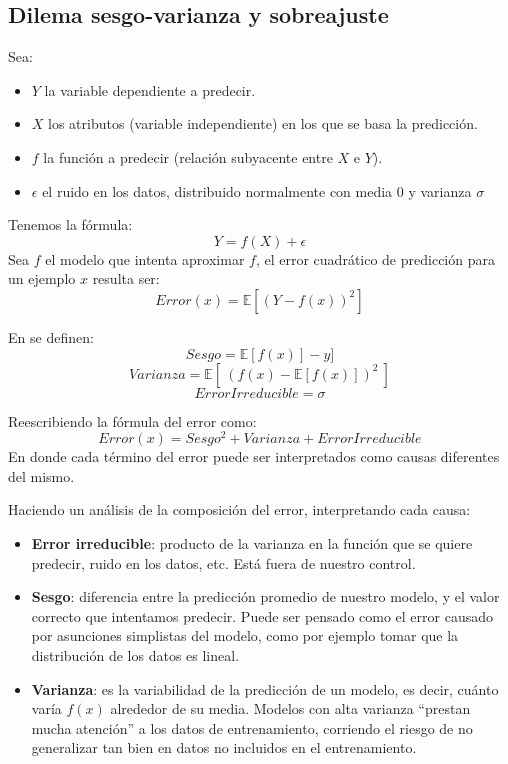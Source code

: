 \subsection{Dilema sesgo-varianza y sobreajuste}

Sea:
\begin{itemize}
    \item $Y$ la variable dependiente a predecir.
    \item $X$ los atributos (variable independiente) en los que se basa la predicción.
    \item $f$ la función a predecir (relación subyacente entre $X$ e $Y$).
    \item $\epsilon$ el ruido en los datos, distribuido normalmente con media $0$ y varianza $\sigma$
\end{itemize}
Tenemos la fórmula:
\begin{equation*}
    Y = f(X) + \epsilon
\end{equation*}
Sea $f$ el modelo que intenta aproximar $f$, el error cuadrático de predicción para un ejemplo $x$ resulta ser:
\begin{equation*}
    Error(x) = \mathbb{E}[(Y - f(x))^2]
\end{equation*}

En \cite{Hastie} se definen:
\begin{equation*}
    Sesgo = \mathbb{E}[f(x)] - y]
\end{equation*}
\begin{equation*}
    Varianza = \mathbb{E}[~(f(x) - \mathbb{E}[f(x)])^2~]
\end{equation*}
\begin{equation*}
    ErrorIrreducible = \sigma
\end{equation*}

Reescribiendo la fórmula del error como:
\begin{equation*}
    Error(x) = Sesgo^2 + Varianza + ErrorIrreducible
\end{equation*}
En donde cada término del error puede ser interpretados como causas diferentes del mismo. 

Haciendo un análisis de la composición del error, interpretando cada causa:
\begin{itemize}
    \item \textbf{Error irreducible}: producto de la varianza en la función que se quiere predecir, ruido en los datos, etc. Está fuera de nuestro control.
    \item \textbf{Sesgo}: diferencia entre la predicción promedio de nuestro modelo, y el valor correcto que intentamos predecir. Puede ser pensado como el error causado por asunciones simplistas del modelo, como por ejemplo tomar que la distribución de los datos es lineal.
    \item \textbf{Varianza}: es la variabilidad de la predicción de un modelo, es decir, cuánto varía $f(x)$ alrededor de su media. Modelos con alta varianza ``prestan mucha atención'' a los datos de entrenamiento, corriendo el riesgo de no generalizar tan bien en datos no incluidos en el entrenamiento.
\end{itemize}

